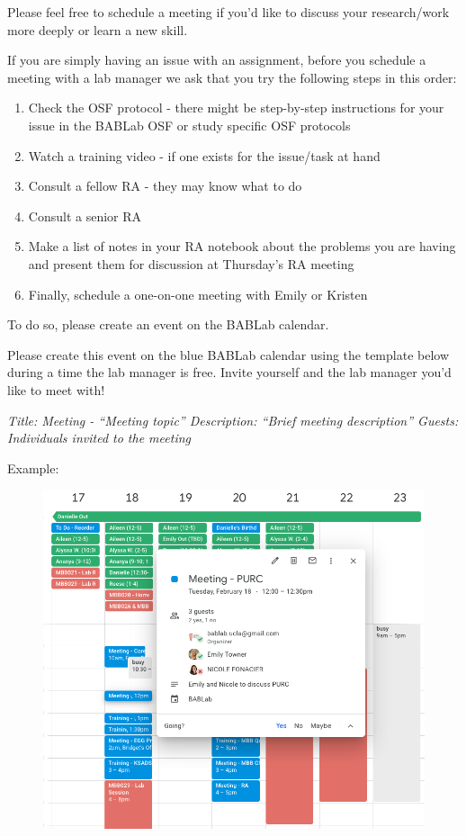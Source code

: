 \documentclass[]{book}
\providecommand{\tightlist}{%
  \setlength{\itemsep}{0pt}\setlength{\parskip}{0pt}}
\begin{document}
Please feel free to schedule a meeting if you'd like to discuss your research/work more deeply or learn a new skill.

If you are simply having an issue with an assignment, before you schedule a meeting with a lab manager we ask that you try the following steps in this order:

\begin{enumerate}
\def\labelenumi{\arabic{enumi}.}
\tightlist
\item
  Check the OSF protocol - there might be step-by-step instructions for your issue in the BABLab OSF or study specific OSF protocols
\item
  Watch a training video - if one exists for the issue/task at hand
\item
  Consult a fellow RA - they may know what to do
\item
  Consult a senior RA
\item
  Make a list of notes in your RA notebook about the problems you are having and present them for discussion at Thursday's RA meeting
\item
  Finally, schedule a one-on-one meeting with Emily or Kristen
\end{enumerate}

To do so, please create an event on the BABLab calendar.

Please create this event on the blue BABLab calendar using the template below during a time the lab manager is free. Invite yourself and the lab manager you'd like to meet with!

\emph{Title: Meeting - ``Meeting topic''
Description: ``Brief meeting description''
Guests: Individuals invited to the meeting}

Example:

\begin{figure}
\centering
\includegraphics{images/lab_protocols/trainee_tuesdays_thursdays/1.png}
\caption{}
\end{figure}
\end{document}
